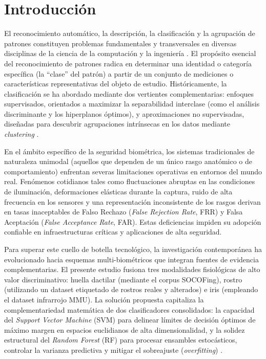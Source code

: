 \section{Introducción}\label{sec:intro}

El reconocimiento automático, la descripción, la clasificación y la agrupación de patrones constituyen problemas fundamentales y transversales en diversas disciplinas de la ciencia de la computación y la ingeniería \cite{jain2000,fieguth2022}. El propósito esencial del reconocimiento de patrones radica en determinar una identidad o categoría específica (la ``clase'' del patrón) a partir de un conjunto de mediciones o características representativas del objeto de estudio. Históricamente, la clasificación se ha abordado mediante dos vertientes complementarias: enfoques supervisados, orientados a maximizar la separabilidad interclase (como el análisis discriminante y los hiperplanos óptimos), y aproximaciones no supervisadas, diseñadas para descubrir agrupaciones intrínsecas en los datos mediante \textit{clustering} \cite{bishop2006,duda2000}.

En el ámbito específico de la seguridad biométrica, los sistemas tradicionales de naturaleza unimodal (aquellos que dependen de un único rasgo anatómico o de comportamiento) enfrentan severas limitaciones operativas en entornos del mundo real. Fenómenos cotidianos tales como fluctuaciones abruptas en las condiciones de iluminación, deformaciones elásticas durante la captura, ruido de alta frecuencia en los sensores y una representación inconsistente de los rasgos derivan en tasas inaceptables de Falso Rechazo (\textit{False Rejection Rate}, FRR) y Falsa Aceptación (\textit{False Acceptance Rate}, FAR). Estas deficiencias impiden su adopción confiable en infraestructuras críticas y aplicaciones de alta seguridad.

Para superar este cuello de botella tecnológico, la investigación contemporánea ha evolucionado hacia esquemas multi-biométricos que integran fuentes de evidencia complementarias. El presente estudio fusiona tres modalidades fisiológicas de alto valor discriminativo: huella dactilar (mediante el corpus SOCOFing), rostro (utilizando un dataset etiquetado de rostros reales y alterados) e iris (empleando el dataset infrarrojo MMU). La solución propuesta capitaliza la complementariedad matemática de dos clasificadores consolidados: la capacidad del \textit{Support Vector Machine} (SVM) para delinear límites de decisión óptimos de máximo margen en espacios euclidianos de alta dimensionalidad, y la solidez estructural del \textit{Random Forest} (RF) para procesar ensambles estocásticos, controlar la varianza predictiva y mitigar el sobreajuste (\textit{overfitting}) \cite{sonal2025}.


